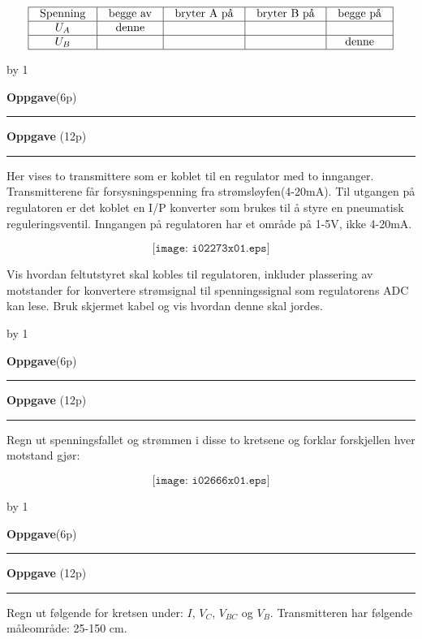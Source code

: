 \documentclass[12pt,a4paper]{article}
\def\oppgave{
            \advance\questnum by 1
	    \ifthenelse{\questnum>0\AND \questnum<9}
	    {
                \vskip 1cm
		\textbf{Oppgave}\hskip 5pt\the\questnum \hfill \hfill(6p)
		\vskip 3pt
		\hrule
	\vskip 0.5cm}
	{
                \vskip 1cm
		\textbf{Oppgave}\hskip 5pt \the\questnum \hfill \hfill(12p)
		\vskip 3pt \hrule \vskip 0.5cm }

		}
\begin{document}

$$\vbox{\offinterlineskip
\halign{\strut
\vrule \quad\hfil # \ \hfil & 
\vrule \quad\hfil # \ \hfil & 
\vrule \quad\hfil # \ \hfil & 
\vrule \quad\hfil # \ \hfil & 
\vrule \quad\hfil # \ \hfil \vrule \cr
\noalign{\hrule}
%
Spenning & begge av & bryter A på & bryter B på & begge på \cr
%
\noalign{\hrule}
%
$U_A$ & denne  &  &  &  \cr
%
\noalign{\hrule}
%
$U_B$ &  &  &  & denne  \cr
%
\noalign{\hrule}
} %
}$$ %

\vskip 2.5pt 

\vskip 2.5pt 

\vskip 2.5pt 
\newpage
\oppgave{}%
\vskip 2.5pt 
Her vises to transmittere som er koblet til en regulator med to innganger. Transmitterene får forsysningspenning fra strømsløyfen(4-20mA). Til utgangen på regulatoren er det koblet en I/P konverter som brukes til å styre en pneumatisk reguleringsventil. Inngangen på regulatoren har et område på 1-5V, ikke 4-20mA. 

$$\texttt{[image: i02273x01.eps]}$$

Vis hvordan feltutstyret skal kobles til regulatoren, inkluder plassering av motstander for konvertere strømsignal til spenningssignal som regulatorens ADC kan lese. Bruk skjermet kabel og vis hvordan denne skal jordes. 



\vskip 2.5pt 

\vskip 2.5pt 
\newpage
\oppgave{}%
\vskip 2.5pt 
Regn ut spenningsfallet og strømmen i disse to kretsene og forklar forskjellen hver motstand gjør:

$$\texttt{[image: i02666x01.eps]}$$


\vskip 2.5pt 
\newpage
\oppgave{}%
\vskip 2.5pt 
Regn ut følgende for kretsen under: $I$, $V_{C}$, $V_{BC}$ og $V_{B}$. Transmitteren har følgende måleområde: 25-150 cm.  
\end{document}
